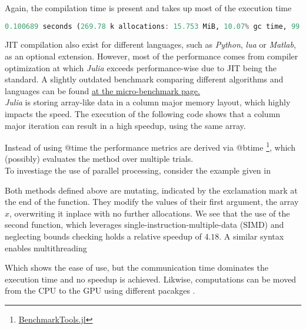 

Again, the compilation time is present and takes up most of the execution time

\begin{lstlisting}[language=Julia]
    0.100689 seconds (269.78 k allocations: 15.753 MiB, 10.07% gc time, 99.92% compilation time)
\end{lstlisting}

JIT compilation also exist for different languages, such as \textit{Python}, \textit{lua} or \textit{Matlab}\cite{JMMATLAB2010}, as an optional extension. However, most of the performance comes
from compiler optimization at which \textit{Julia} exceeds performance-wise due to JIT being the standard. 
A slightly outdated benchmark comparing different algorithms and languages can be found \href{https://julialang.org/benchmarks/}{at the micro-benchmark page.}\\

\textit{Julia} is storing array-like data in a column major memory layout, which highly impacts the speed. The execution of the following
code shows that a column major iteration can result in a high speedup, using the same array. 



Instead of using @time the performance metrics are derived via @btime \footnote{\href{https://github.com/JuliaCI/BenchmarkTools.jl}{BenchmarkTools.jl}}, which (possibly) evaluates the method over multiple trials.\\

To investiage the use of parallel processing, consider the example given in \cite[p. 178 ff.]{JMSengupta2019}



Both methods defined above are mutating, indicated by the exclamation mark at the end of the function. They modify the values of their first argument, the array $x$, overwriting it inplace with no further allocations.
We see that the use of the second function, which leverages single-instruction-multiple-data (SIMD) and neglecting bounds checking holds a relative speedup of $4.18$. A similar syntax enables multithreading



Which shows the ease of use, but the communication time dominates the execution time and no speedup is achieved. Likwise, computations can be moved from the CPU to the GPU using different pacakges \cite[p.204 ff.]{JMSengupta2019}.
















